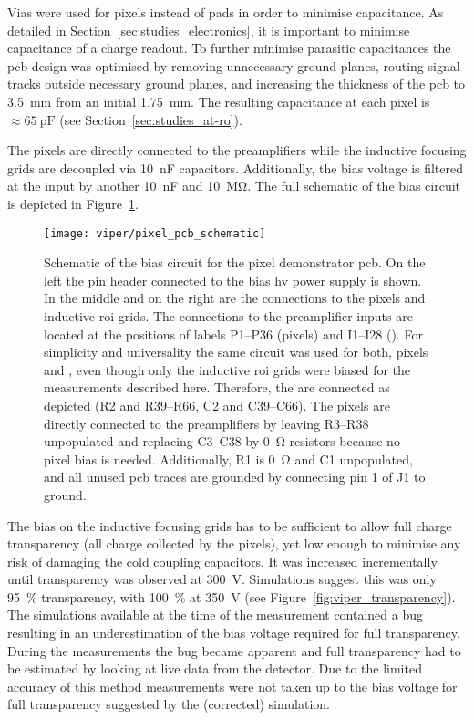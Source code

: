 Vias were used for pixels instead of pads in order to minimise capacitance.
As detailed in Section~\ref{sec:studies_electronics}, it is important to minimise capacitance of a charge readout.
To further minimise parasitic capacitances the \gls{pcb} design was optimised by removing unnecessary ground planes, routing signal tracks outside necessary ground planes, and increasing the thickness of the \gls{pcb} to \SI{3.5}{\milli\metre} from an initial \SI{1.75}{\milli\metre}. 
The resulting capacitance at each pixel is $\approx \SI{65}{\pico\farad}$ (see Section~\ref{sec:studies_at-ro}).

The pixels are directly connected to the preamplifiers while the inductive focusing grids are decoupled via \SI{10}{\nano\farad} capacitors.
Additionally, the bias voltage is filtered at the input by another \SI{10}{\nano\farad} and \SI{10}{\mega\ohm}.
The full schematic of the bias circuit is depicted in Figure~\ref{fig:viper_pcb_schematic}.

\begin{figure}[tbp]
	\centering
	\texttt{[image: viper/pixel\_pcb\_schematic]}
	\caption[Pixel demonstrator bias circuit]{%
		Schematic of the bias circuit for the \AC{} pixel demonstrator \acrshort{pcb}.
		On the left the pin header connected to the bias \acrshort{hv} power supply is shown. In the middle and on the right are the connections to the pixels and inductive \acrshort{roi} grids.
		The connections to the preamplifier inputs are located at the positions of labels P1--P36 (pixels) and I1--I28 ().
		For simplicity and universality the same circuit was used for both, pixels and , even though only the inductive \acrshort{roi} grids were biased for the measurements described here.
		Therefore, the  are connected as depicted (R2 and R39--R66, C2 and C39--C66).
		The pixels are directly connected to the preamplifiers by leaving R3--R38 unpopulated and replacing C3--C38 by \SI{0}{\ohm} resistors because no pixel bias is needed.
		Additionally, R1 is \SI{0}{\ohm} and C1 unpopulated, and all unused \acrshort{pcb} traces are grounded by connecting pin 1 of J1 to ground.
	}
	\label{fig:viper_pcb_schematic}
\end{figure}

The bias on the inductive focusing grids has to be sufficient to allow full charge transparency (all charge collected by the pixels), yet low enough to minimise any risk of damaging the cold coupling capacitors.
It was increased incrementally until transparency was observed at \SI{300}{\volt}. 
Simulations suggest this was only \SI{95}{\percent} transparency, with \SI{100}{\percent} at \SI{350}{\volt} (see Figure~\ref{fig:viper_transparency}).
The simulations available at the time of the measurement contained a bug resulting in an underestimation of the bias voltage required for full transparency.
During the measurements the bug became apparent and full transparency had to be estimated by looking at live data from the detector.
Due to the limited accuracy of this method measurements were not taken up to the bias voltage for full transparency suggested by the (corrected) simulation.~\cite{francypants}

